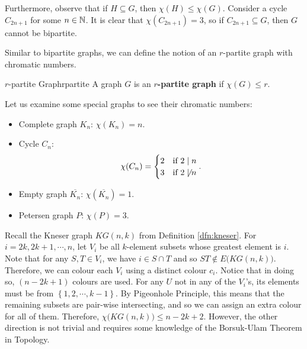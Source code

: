 \documentclass[math, code]{amznotes}
\theoremstyle{remark}
\begin{document}
Furthermore, observe that if $H \subseteq G$, then $\chi(H) \leq \chi(G)$. Consider a cycle $C_{2n + 1}$ for some $n \in \mathbb{N}$. It is clear that $\chi(C_{2n + 1}) = 3$, so if $C_{2n + 1} \subseteq G$, then $G$ cannot be bipartite.

Similar to bipartite graphs, we can define the notion of an $r$-partite graph with chromatic numbers.
\begin{dfnbox}{$r$-partite Graph}{rpartite}
    A graph $G$ is an {\color{red} \textbf{$r$-partite graph}} if $\chi(G) \leq r$.
\end{dfnbox}
Let us examine some special graphs to see their chromatic numbers:
\begin{itemize}
    \item Complete graph $K_n$: $\chi(K_n) = n$.
    \item Cycle $C_n$: 
    \begin{equation*}
        \chi(C_n) = \begin{cases}
            2 & \textrm{if } 2 \mid n \\
            3 & \textrm{if } 2 \not\mid n
        \end{cases}.
    \end{equation*}
    \item Empty graph $\overline{K_n}$: $\chi\left(\overline{K_n}\right) = 1$.
    \item Petersen graph $P$: $\chi(P) = 3$.
\end{itemize}
Recall the Kneser graph $KG(n, k)$ from Definition \ref{dfn:kneser}. For $i = 2k, 2k + 1, \cdots, n$, let $V_i$ be all $k$-element subsets whose greatest element is $i$. Note that for any $S, T \in V_i$, we have $i \in S \cap T$ and so $ST \notin E\bigl(KG(n, k)\bigr)$. Therefore, we can colour each $V_i$ using a distinct colour $c_i$. Notice that in doing so, $(n - 2k + 1)$ colours are used. For any $U$ not in any of the $V_i$'s, its elements must be from $\left\{1, 2, \cdots, k - 1\right\}$. By Pigeonhole Principle, this means that the remaining subsets are pair-wise intersecting, and so we can assign an extra colour for all of them. Therefore, $\chi\bigl(KG(n, k)\bigr) \leq n - 2k + 2$. However, the other direction is not trivial and requires some knowledge of the Borsuk-Ulam Theorem in Topology.
\end{document}
